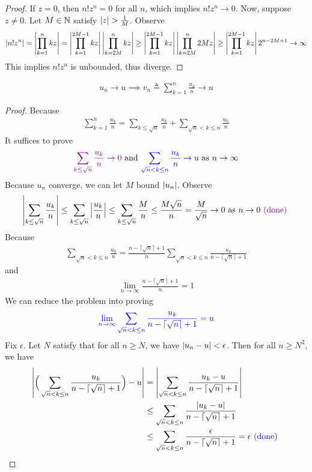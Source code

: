 \documentclass{report}
\begin{document}
\begin{proof}
If $z=0$, then  $n!z^n=0$ for all  $n$, which implies  $n!z^n\to 0$. Now, suppose $z\neq 0$. Let $M\in\mathbb{N}$ satisfy $\abso{z}>\frac{1}{M}$. Observe 
\begin{align*}
\left|n!z^n\right|=\left|\prod_{k=1}^n kz\right|=\left|\prod_{k=1}^{2M-1} kz \right| \left|\prod_{k=2M}^{n} kz \right|\geq \left|\prod_{k=1}^{2M-1}kz\right|\left|\prod_{k=2M}^n 2Mz\right|\geq \left|\prod_{k=1}^{2M-1}kz\right|2^{n-2M+1}\to \infty
\end{align*}
This implies $n!z^n$ is unbounded, thus diverge.
\end{proof}
\begin{theorem}
  \begin{align*}
  u_n\to u\implies v_n\triangleq \sum_{k=1}^n \frac{u_k}{n}\to u
  \end{align*}
\end{theorem}
\begin{proof}
Because 
\begin{align*}
\sum_{k=1}^n \frac{u_k}{n}=\sum_{k\leq \sqrt{n}}\frac{u_k}{n}+ \sum_{\sqrt{n}<k\leq n}\frac{u_k}{n}
\end{align*}
It suffices to prove 
\begin{align*}
\textcolor{violet}{\sum_{k\leq \sqrt{n} }\frac{u_k}{n}\to 0}\text{ and }\textcolor{blue}{\sum_{\sqrt{n}<k\leq n}\frac{u_k}{n}\to u}\text{ as }n\to \infty
\end{align*}
Because $u_n$ converge, we can let  $M$ bound  $\left|u_n\right|$. Observe 
\begin{align*}
\left|\sum_{k\leq \sqrt{n} } \frac{u_k}{n}\right|\leq \sum_{k\leq \sqrt{n}} \left|\frac{u_k}{n}\right|\leq \sum_{k\leq \sqrt{n}} \frac{M}{n}\leq \frac{M\sqrt{n} }{n}=\frac{M}{\sqrt{n}}\to 0\text{ as }n\to 0\textcolor{violet}{\text{ (done) }}
\end{align*}
Because 
\begin{align*}
\sum_{\sqrt{n}<k\leq n} \frac{u_k}{n}= \frac{n-\lceil \sqrt{n}\rceil +1 }{n}\sum_{\sqrt{n}<k\leq n} \frac{u_k}{n-\lceil \sqrt{n}  \rceil+1}
\end{align*}
and 
\begin{align*}
  \lim_{n\to \infty} \frac{n- \lceil \sqrt{n}\rceil +1 }{n}=1
\end{align*}
We can reduce the problem into proving 
\begin{align*}
  \textcolor{blue}{\lim_{n\to \infty}\sum_{\sqrt{n}<k\leq n} \frac{u_k}{n- \lceil \sqrt{n}\rceil +1 }=u}
\end{align*}
Fix $\epsilon $. Let $N$ satisfy that for all  $n\geq N$, we have $\left|u_n-u\right|<\epsilon $. Then for all $n \geq N^2$, we have 
\begin{align*}
  \left|\Big(\sum_{\sqrt{n}<k \leq n } \frac{u_k}{n-\lceil \sqrt{n}\rceil +1 } \Big)- u\right|  &=\left|\sum_{\sqrt{n}<k\leq n } \frac{u_k-u}{n-\lceil \sqrt{n}\rceil +1 } \right|\\
  &\leq \sum_{\sqrt{n}<k\leq n} \frac{\left|u_k-u\right|}{n-\lceil \sqrt{n}\rceil +1  }\\
  &\leq \sum_{\sqrt{n}<k\leq n} \frac{\epsilon }{n-\lceil \sqrt{n}\rceil +1  }=\epsilon \textcolor{blue}{\text{ (done) }}
\end{align*}
\end{proof}
\end{document}

